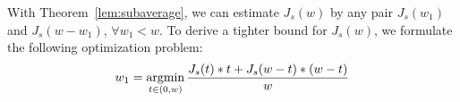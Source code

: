 


With Theorem~\ref{lem:subaverage}, we can estimate $J_s(w)$ by any pair $J_s(w_1)$ and $J_s(w-w_1) $, $\forall w_1 < w$. 
To derive a tighter bound for $J_s(w)$, we formulate the following optimization problem:
%
\begin{equation}  
\label{eq:cw_mini_1}
w_1 = \operatorname*{argmin}_{t \in (0,w)}\frac{J_s(t)*t + J_s(w-t) *(w-t)}{w}
\end{equation}

